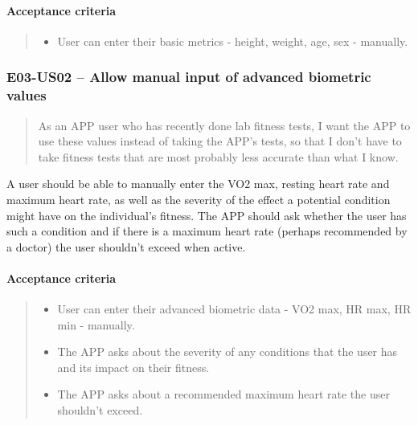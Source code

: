 \paragraph*{Acceptance criteria}
\begin{quote}
\begin{itemize}
    \item User can enter their basic metrics - height, weight, age, sex - manually.
\end{itemize}
\end{quote}

\subsubsection*{E03-US02 -- Allow manual input of advanced biometric values}
\begin{quote}
As an APP user who has recently done lab fitness tests, I want the APP to use these values instead of taking the APP's tests, so that I don't have to take fitness tests that are most probably less accurate than what I know.
\end{quote}

A user should be able to manually enter the VO2 max, resting heart rate and maximum heart rate, as well as the severity of the effect a potential condition might have on the individual's fitness.
The APP should ask whether the user has such a condition and if there is a maximum heart rate (perhaps recommended by a doctor) the user shouldn't exceed when active.

\paragraph*{Acceptance criteria}
\begin{quote}
\begin{itemize}
    \item User can enter their advanced biometric data - VO2 max, HR max, HR min - manually.
    \item The APP asks about the severity of any conditions that the user has and its impact on their fitness.
    \item The APP asks about a recommended maximum heart rate the user shouldn't exceed.
\end{itemize}
\end{quote}


